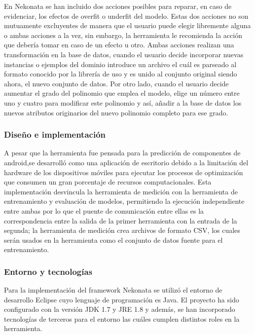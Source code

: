 En Nekonata se han incluido dos acciones posibles para reparar, en
caso de evidenciar, los efectos de overfit o underfit del modelo.
Estas dos acciones no son mutuamente excluyentes de manera que el
usuario puede elegir libremente alguna o ambas acciones a la vez,
sin embargo, la herramienta le recomienda la acción que debería tomar
en caso de un efecto u otro. Ambas acciones realizan una transformación
en la base de datos, cuando el usuario decide incorporar nuevas instancias
o ejemplos del dominio introduce un archivo el cuál es parseado al
formato conocido por la librería de uso y es unido al conjunto original
siendo ahora, el nuevo conjunto de datos. Por otro lado, cuando el
usuario decide aumentar el grado del polinomio que emplea el modelo,
elige un número entre uno y cuatro para modificar este polinomio y
así, añadir a la base de datos los nuevos atributos originarios del
nuevo polinomio completo para ese grado. 


\subsubsection{Diseño e implementación}

A pesar que la herramienta fue pensada para la predicción de componentes
de android,se desarrolló como una aplicación de escritorio debido
a la limitación del hardware de los dispositivos móviles para ejecutar
los procesos de optimización que consumen un gran porcentaje de recursos
computacionales. Esta implementación desvincula la herramienta de
medición con la herramienta de entrenamiento y evaluación de modelos,
permitiendo la ejecución independiente entre ambas por lo que el puente
de comunicación entre ellas es la correspondencia entre la salida
de la primer herramienta con la entrada de la segunda; la herramienta
de medición crea archivos de formato \ac{CSV}, los cuales serán usados
en la herramienta como el conjunto de datos fuente para el entrenamiento. 


\subsubsection*{Entorno y tecnologías}

Para la implementación del framework Nekonata se utilizó el entorno
de desarrollo Eclipse cuyo lenguaje de programación es Java. El proyecto
ha sido configurado con la versión \ac{JDK} 1.7 y \ac{JRE} 1.8 y
además, se han incorporado tecnologías de terceros para el entorno
las cuáles cumplen distintos roles en la herramienta. 

